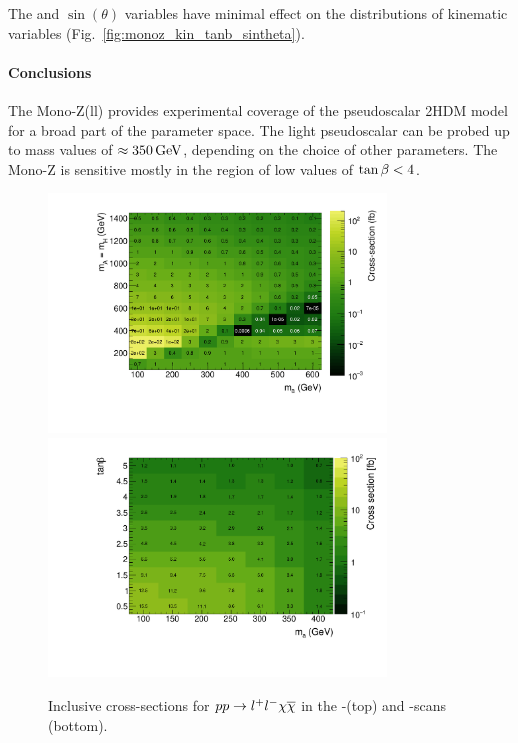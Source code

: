 The \tanb and $\sin(\theta)$ variables have minimal effect on the distributions of kinematic variables (Fig.~\ref{fig:monoz_kin_tanb_sintheta}).

\paragraph{Conclusions} The Mono-Z(ll) provides experimental coverage of the pseudoscalar 2HDM model for a broad part of the parameter space. The light pseudoscalar \a can be probed up to mass values of $\approx\unit[350]{GeV}$, depending on the choice of other parameters. The Mono-Z is sensitive mostly in the region of low values of $\tan\beta<4$.

\begin{figure}
\centering
\includegraphics[width=0.8\textwidth]{texinputs/04_grid/figures/monoz/leptonic/xs_2d_inclusive_26300.pdf}
\includegraphics[width=0.8\textwidth]{texinputs/04_grid/figures/monoz/leptonic/tanbma_xsec_ll.pdf}
\caption{Inclusive cross-sections for $pp\rightarrow l^{+}l^{-}\chi\overline{\chi}$ in the \ma-\mA (top) and \ma-\tanb scans (bottom).}
\label{fig:monoz_ll_xs_inclusive}
\end{figure}


